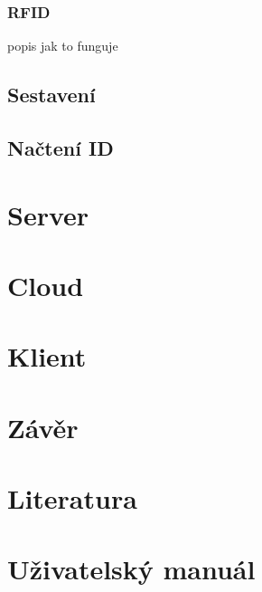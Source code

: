 \documentclass{bakalarka}
\begin{document}
		\subsection{RFID}
			popis jak to funguje
	
	

	\section{Sestavení}

	\section{Načtení ID}



\chapter{Server}

\chapter{Cloud}

\chapter{Klient}



\chapter{Závěr}


\chapter*{Literatura}

\chapter*{Uživatelský manuál}


\appendix


\end{document}
